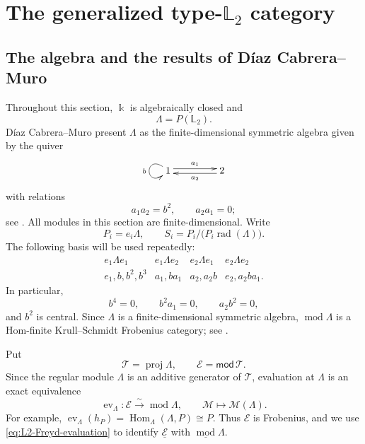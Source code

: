 \documentclass[a4paper,11pt,reqno]{amsart}
\theoremstyle{definition}
\theoremstyle{plain}
\numberwithin{equation}{section}
\newcommand{\T}{\mathcal T}
\newcommand{\Hom}{\operatorname{Hom}}
\newcommand{\kk}{\Bbbk}
\begin{document}
\section{The generalized type-\texorpdfstring{$\mathbb{L}_2$}{L2}
category}
\label{sec:L2-test}

\subsection{The algebra and the results of D\'iaz Cabrera--Muro}

Throughout this section, \(\kk\) is algebraically closed and
\[
 \Lambda=P(\mathbb L_2).
\]
D\'iaz Cabrera--Muro present \(\Lambda\) as the finite-dimensional
symmetric algebra given by the quiver
\begin{equation*}
 \xymatrix@C=3.6pc@R=2pc{
  1\ar@(ul,dl)[]_{b}\ar@<0.55ex>[r]^{a_1}&
  2\ar@<0.55ex>[l]^{a_2}
 }
\end{equation*}
with relations
\[
 a_1a_2=b^2,
 \qquad
 a_2a_1=0;
\]
see \cite[pp.~2--3]{DiazCabreraMuro2026}.  All modules in this section
are finite-dimensional.  Write
\[
 P_i=e_i\Lambda,
 \qquad
 S_i=P_i/\bigl(P_i\operatorname{rad}(\Lambda)\bigr).
\]
The following basis will be used repeatedly:
\[
\begin{array}{c|c|c|c}
e_1\Lambda e_1&e_1\Lambda e_2&e_2\Lambda e_1&e_2\Lambda e_2\\ \hline
e_1,b,b^2,b^3&a_1,ba_1&a_2,a_2b&e_2,a_2ba_1.
\end{array}
\]
In particular,
\begin{equation}
\label{eq:L2-elementary-relations}
 b^4=0,
 \qquad
 b^2a_1=0,
 \qquad
 a_2b^2=0,
\end{equation}
and \(b^2\) is central.  Since \(\Lambda\) is a finite-dimensional
symmetric algebra, \(\operatorname{mod}\Lambda\) is a Hom-finite
Krull--Schmidt Frobenius category; see
\cite[Chapter~I, Section~2]{Happel1988}.

Put
\[
 \T=\operatorname{proj}\Lambda,
 \qquad
 \mathcal E=\mathsf{mod}\,\T.
\]
Since the regular module \(\Lambda\) is an
additive generator of \(\T\), evaluation at
\(\Lambda\) is an exact equivalence
\begin{equation}
\label{eq:L2-Freyd-evaluation}
 \operatorname{ev}_\Lambda:
 \mathcal E\xrightarrow{\ \sim\ }\operatorname{mod}\Lambda,
 \qquad
 \mathcal M\longmapsto\mathcal M(\Lambda).
\end{equation}
For example,
\(\operatorname{ev}_\Lambda(h_P)=\Hom_\Lambda(\Lambda,P)\cong P\).
Thus \(\mathcal E\) is Frobenius, and we use
\eqref{eq:L2-Freyd-evaluation} to identify
\(\underline{\mathcal E}\) with
\(\underline{\operatorname{mod}}\Lambda\).
\end{document}
